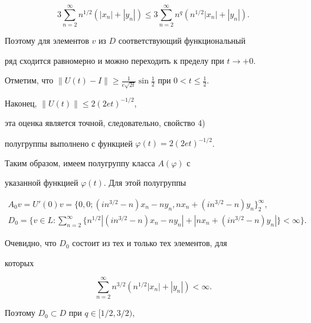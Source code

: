 $$


3 \sum^{\infty}_{n=2}n^{1/2}(|x_{n}|+|y_{n}|)\leq


3 \sum^{\infty}_{n=2} n^q(n^{1/2}|x_{n}|+|y_{n}|).


$$


Поэтому для элементов $v$ из $D$ соответствующий функциональный


ряд сходится равномерно и можно переходить к пределу при $t\to + 0$.





Отметим, что $\| U(t)-I\|\geq


\frac{1}{e\sqrt{2t}}\sin\frac{1}{2}$ при $0< t\leq \frac{1}{2}$.





Наконец, $\| U(t)\| \leq 2(2et)^{-1/2}$,


эта оценка является точной, следовательно, свойство 4)


полугруппы выполнено с  функцией $\varphi(t)=2(2et)^{-1/2}$.


Таким образом, имеем полугруппу класса $A(\varphi)$ с


указанной функцией $\varphi(t)$. Для этой полугруппы


\begin{gather*}


A_{0}v=U'(0)v=


\{0,0; (in^{3/2}-n)x_{n}-ny_{n}, nx_{n}+(in^{3/2}-n)y_{n}


\}^{\infty}_{2}, \\


%


D_{0}=\bigg\{v\in L:\sum^{\infty}_{n=2}


\{ n^{1/2}|(in^{3/2}-n)x_{n}-ny_{n}|+


|nx_{n}+(in^{3/2}-n)y_{n}|\} < \infty\bigg\}.


\end{gather*}





Очевидно, что $D_{0}$ состоит из тех и только тех элементов, для


которых


$$


\sum^{\infty}_{n=2}n^{3/2}


(n^{1/2}|x_{n}|+|y_{n}|)< \infty.


$$


Поэтому $D_{0}\subset D$ при  $q \in [1/2,3/2)$,


